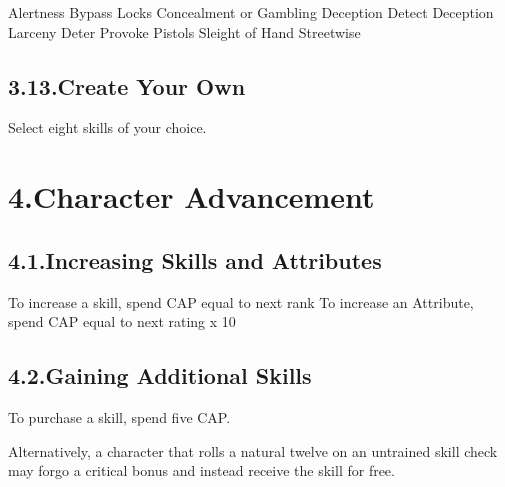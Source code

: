 \documentclass{article}
\begin{document}
\noindent{}Alertness\mdbr
{}Bypass Locks\mdbr
{}Concealment or Gambling
Deception
Detect Deception
Larceny \mdbr
{}Deter\mdbr
{}Provoke\mdbr
{}Pistols\mdbr
{}Sleight of Hand\mdbr
{}Streetwise %

\subsection{3.13.\hspace*{0.5em}Create Your Own}\label{sec-create-your-own}%

\noindent{}Select eight skills of your choice.%

\mdhr{}%

\section{4.\hspace*{0.5em}Character Advancement}\label{sec-character-advancement}%

\subsection{4.1.\hspace*{0.5em}Increasing Skills and Attributes}\label{sec-increasing-skills-and-attributes}%

\noindent{}To increase a skill, spend CAP equal to next rank\mdbr
{}To increase an Attribute, spend CAP equal to next rating x 10%

\subsection{4.2.\hspace*{0.5em}Gaining Additional Skills}\label{sec-gaining-additional-skills}%

\noindent{}To purchase a skill, spend five CAP.%

Alternatively, a character that rolls a natural twelve on an untrained skill check may forgo a critical bonus and instead receive the skill for free.%
\end{document}
